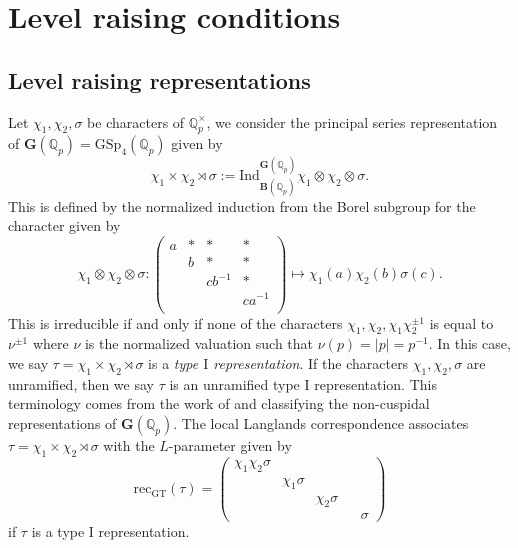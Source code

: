 \documentclass[10pt]{amsart}
\numberwithin{equation}{section}
\theoremstyle{definition}
\def\GSp{\mathrm{GSp}}
\def\bfB{\mathbf{B}}
\def\bfG{\mathbf{G}}
\def\QQ{\mathbb{Q}}
\def\rmI{\mathrm{I}}
\begin{document}
\section{Level raising conditions}
\subsection{Level raising representations}
Let $\chi_{1}, \chi_{2}, \sigma$ be characters of $\QQ^{\times}_{p}$, we consider the principal series representation of $\bfG(\QQ_{p})=\GSp_{4}(\QQ_{p})$ given by
\begin{equation*}
\chi_{1}\times\chi_{2}\rtimes \sigma:= \mathrm{Ind}^{\bfG(\QQ_{p})}_{\mathrm{\bfB}(\QQ_{p})}\chi_{1}\otimes\chi_{2}\otimes \sigma.
\end{equation*}
This is defined by the normalized induction from the Borel subgroup for the character given by
\begin{equation*}
\chi_{1}\otimes\chi_{2}\otimes\sigma: \begin{pmatrix}a&\ast&\ast&\ast\\ &b&\ast&\ast\\  &&cb^{-1}&\ast\\  &&&ca^{-1}\\ \end{pmatrix}\mapsto \chi_{1}(a)\chi_{2}(b)\sigma(c).
\end{equation*}
This is irreducible if and only if none of the characters $\chi_{1}, \chi_{2}, \chi_{1}\chi^{\pm1}_{2}$ is equal to $\nu^{\pm1}$ where $\nu$ is the normalized valuation such that $\nu(p)=\vert p\vert=p^{-1}$. In this case, we say $\tau=\chi_{1}\times\chi_{2}\rtimes \sigma$ is a {\em type $\rmI$ representation}. If the characters $\chi_{1}, \chi_{2}, \sigma$ are unramified, then we say $\tau$ is an unramified type $\rmI$ representation. This terminology comes from the work of \cite{ST-classification} and \cite{Sch-Iwahori} classifying the non-cuspidal representations of $\bfG(\QQ_{p})$. 
The local Langlands correspondence associates $\tau=\chi_{1}\times\chi_{2}\rtimes \sigma$ with the $L$-parameter given by
\begin{equation*}
\mathrm{rec}_{\mathrm{GT}}(\tau)= \begin{pmatrix}\chi_{1}\chi_{2}\sigma&&&\\&\chi_{1}\sigma&&&\\&&\chi_{2}\sigma&&\\&&&&\sigma\end{pmatrix}
\end{equation*}
if $\tau$ is a type I representation. 
\end{document}

